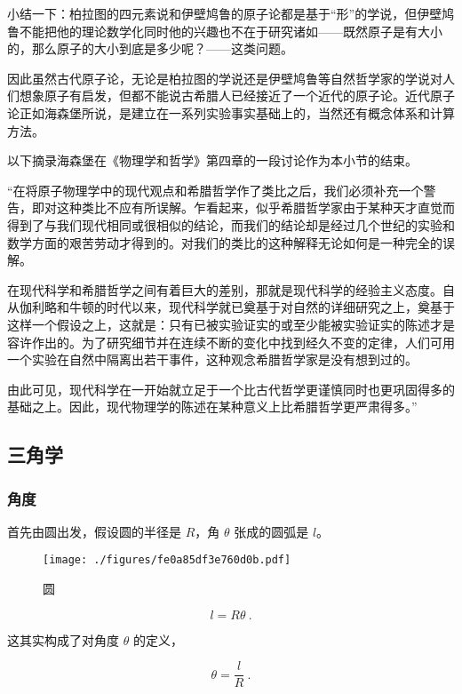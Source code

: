 小结一下：柏拉图的四元素说和伊壁鸠鲁的原子论都是基于“形”的学说，但伊壁鸠鲁不能把他的理论数学化同时他的兴趣也不在于研究诸如——既然原子是有大小的，那么原子的大小到底是多少呢？——这类问题。

因此虽然古代原子论，无论是柏拉图的学说还是伊壁鸠鲁等自然哲学家的学说对人们想象原子有启发，但都不能说古希腊人已经接近了一个近代的原子论。近代原子论正如海森堡所说，是建立在一系列实验事实基础上的，当然还有概念体系和计算方法。

以下摘录海森堡在《物理学和哲学》第四章的一段讨论作为本小节的结束。

“在将原子物理学中的现代观点和希腊哲学作了类比之后，我们必须补充一个警告，即对这种类比不应有所误解。乍看起来，似乎希腊哲学家由于某种天才直觉而得到了与我们现代相同或很相似的结论，而我们的结论却是经过几个世纪的实验和数学方面的艰苦劳动才得到的。对我们的类比的这种解释无论如何是一种完全的误解。

在现代科学和希腊哲学之间有着巨大的差别，那就是现代科学的经验主义态度。自从伽利略和牛顿的时代以来，现代科学就已奠基于对自然的详细研究之上，奠基于这样一个假设之上，这就是：只有已被实验证实的或至少能被实验证实的陈述才是容许作出的。为了研究细节并在连续不断的变化中找到经久不变的定律，人们可用一个实验在自然中隔离出若干事件，这种观念希腊哲学家是没有想到过的。

由此可见，现代科学在一开始就立足于一个比古代哲学更谨慎同时也更巩固得多的基础之上。因此，现代物理学的陈述在某种意义上比希腊哲学更严肃得多。”

\subsection{三角学}

\subsubsection{角度}

首先由圆出发，假设圆的半径是 $R$，角 $\theta$ 张成的圆弧是 $l$。

\begin{figure}[ht]
\centering
\texttt{[image: ./figures/fe0a85df3e760d0b.pdf]}
\caption{圆} \label{fig_AtomId_3}
\end{figure}

\begin{equation}
l = R \theta~.
\end{equation}

这其实构成了对角度 $\theta$ 的定义，

\begin{equation}
\theta = \frac{l }{R }~.
\end{equation}


